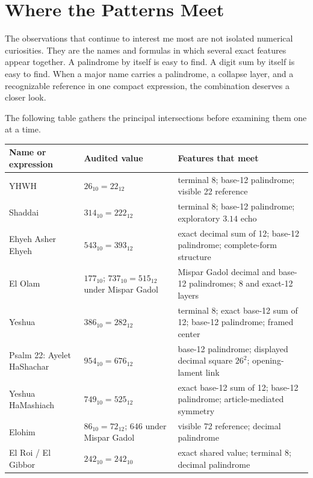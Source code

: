 \section{Where the Patterns Meet}

The observations that continue to interest me most are not isolated numerical curiosities. They are the names and formulas in which several exact features appear together. A palindrome by itself is easy to find. A digit sum by itself is easy to find. When a major name carries a palindrome, a collapse layer, and a recognizable reference in one compact expression, the combination deserves a closer look.

The following table gathers the principal intersections before examining them one at a time.

\begin{center}
\small
\begin{tabular}{>{\raggedright\arraybackslash}p{3.1cm}>{\raggedright\arraybackslash}p{3.2cm}>{\raggedright\arraybackslash}p{6.3cm}}
\toprule
Name or expression & Audited value & Features that meet \\
\midrule
YHWH & $26_{10}=22_{12}$ & terminal 8; base-12 palindrome; visible 22 reference \\
Shaddai & $314_{10}=222_{12}$ & terminal 8; base-12 palindrome; exploratory $3.14$ echo \\
Ehyeh Asher Ehyeh & $543_{10}=393_{12}$ & exact decimal sum of 12; base-12 palindrome; complete-form structure \\
El Olam & $177_{10}$; $737_{10}=515_{12}$ under Mispar Gadol & Mispar Gadol decimal and base-12 palindromes; 8 and exact-12 layers \\
Yeshua & $386_{10}=282_{12}$ & terminal 8; exact base-12 sum of 12; base-12 palindrome; framed center \\
Psalm 22: Ayelet HaShachar & $954_{10}=676_{12}$ & base-12 palindrome; displayed decimal square $26^2$; opening-lament link \\
Yeshua HaMashiach & $749_{10}=525_{12}$ & exact base-12 sum of 12; base-12 palindrome; article-mediated symmetry \\
Elohim & $86_{10}=72_{12}$; $646$ under Mispar Gadol & visible 72 reference; decimal palindrome \\
El Roi / El Gibbor & $242_{10}=242_{10}$ & exact shared value; terminal 8; decimal palindrome \\
\bottomrule
\end{tabular}
\end{center}

